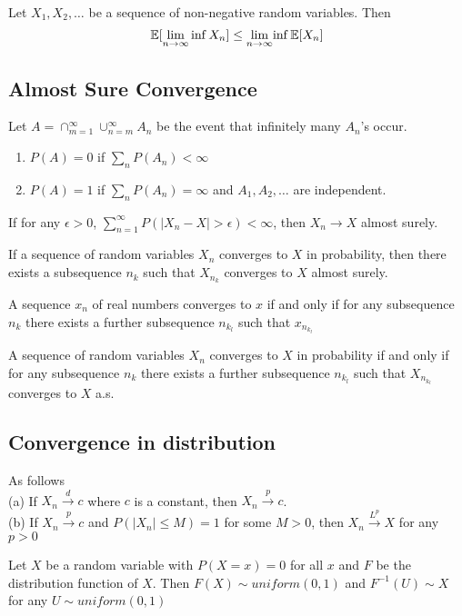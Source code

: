 \documentclass[11pt]{article}
\begin{document}
Let $X_1, X_2, \hdots$ be a sequence of non-negative random variables. Then
$$\mathbb{E}[{\underset{n \rightarrow \infty}{\lim} \inf X_n}] \leq \underset{n \rightarrow \infty}{\lim}{\inf} \,\mathbb{E}[{X_n}]$$


\subsection{Almost Sure Convergence}
Let $A = \cap_{m=1}^\infty\cup_{n=m}^\infty A_n$ be the event that infinitely many $A_n$'s occur.
\begin{enumerate}
	\item $P(A) = 0$ if $\sum_n P(A_n) < \infty$
	\item $P(A) = 1$ if $\sum_n P(A_n) = \infty$ and $A_1, A_2, \hdots$ are independent.
\end{enumerate}

\theorem
If for any $\epsilon > 0$, $\sum_{n=1}^\infty P(|X_n - X| > \epsilon) < \infty$, then $X_n \rightarrow X$ almost surely.

\theorem If a sequence of random variables $X_n$ converges to $X$ in probability, then there exists a subsequence $n_k$ such that $X_{n_k}$ converges to $X$ almost surely.

\theorem
A sequence $x_n$ of real numbers converges to $x$ if and only if for any subsequence $n_k$ there exists a further subsequence $n_{k_l}$ such that $x_{n_{k_l}}$

\theorem
A sequence of random variables $X_n$ converges to $X$ in probability if and only if for any subsequence $n_k$ there exists a further subsequence $n_{k_l}$ such that $X_{n_{k_l}}$ converges to $X$ a.s. 

\subsection{Convergence in distribution}
\theorem
As follows \\
(a) If $X_n \overset{d}{\longrightarrow} c$ where $c$ is a constant, then $X_n \overset{p}{\rightarrow} c$. \\
(b) If $X_n \overset{p}{\longrightarrow} c$ and $P(|X_n| \leq M) = 1$ for some $M > 0$, then $X_n \overset{L^p}{\longrightarrow} X$ for any $p > 0$

\theorem
Let $X$ be a random variable with $P(X=x) = 0$ for all $x$ and $F$ be the distribution function of $X$. Then $F(X) \sim uniform(0,1)$ and $F^{-1}(U) \sim X$ for any $U \sim uniform(0,1)$
\end{document}

